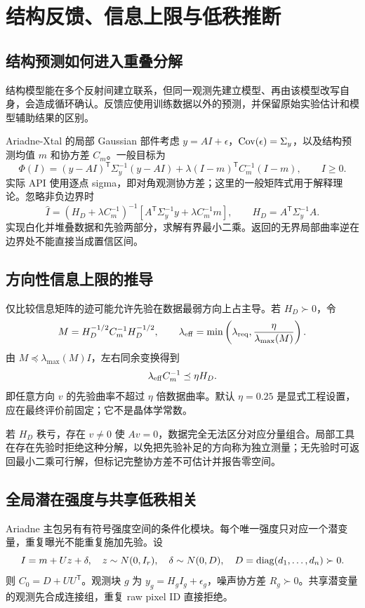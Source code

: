 \chapter{结构反馈、信息上限与低秩推断}
\section{结构预测如何进入重叠分解}
结构模型能在多个反射间建立联系，但同一观测先建立模型、再由该模型改写自身，会造成循环确认。反馈应使用训练数据以外的预测，并保留原始实验估计和模型辅助结果的区别。

Ariadne-Xtal 的局部 Gaussian 部件考虑 $y=A I+\epsilon$，$\operatorname{Cov}(\epsilon)=\Sigma_y$，以及结构预测均值 $m$ 和协方差 $C_m$。一般目标为
\begin{equation}
\Phi(I)=(y-AI)^{\mathsf T}\Sigma_y^{-1}(y-AI)
+\lambda(I-m)^{\mathsf T}C_m^{-1}(I-m),\qquad I\ge0.
\end{equation}
实际  API 使用逐点 sigma，即对角观测协方差；这里的一般矩阵式用于解释理论。忽略非负边界时
\begin{equation}
\widehat I=(H_D+\lambda C_m^{-1})^{-1}
[A^{\mathsf T}\Sigma_y^{-1}y+\lambda C_m^{-1}m],\qquad
H_D=A^{\mathsf T}\Sigma_y^{-1}A.
\end{equation}
实现白化并堆叠数据和先验两部分，求解有界最小二乘。返回的无界局部曲率逆在边界处不能直接当成置信区间。
\section{方向性信息上限的推导}
仅比较信息矩阵的迹可能允许先验在数据最弱方向上占主导。若 $H_D\succ0$，令
\begin{equation}
M=H_D^{-1/2}C_m^{-1}H_D^{-1/2},\qquad
\lambda_{\rm eff}=\min\left(\lambda_{\rm req},\frac{\eta}{\lambda_{\max}(M)}\right).
\end{equation}
由 $M\preceq\lambda_{\max}(M)I$，左右同余变换得到
\begin{equation}
\lambda_{\rm eff}C_m^{-1}\preceq\eta H_D.
\end{equation}
即任意方向 $v$ 的先验曲率不超过 $\eta$ 倍数据曲率。默认 $\eta=0.25$ 是显式工程设置，应在最终评价前固定；它不是晶体学常数。

若 $H_D$ 秩亏，存在 $v\ne0$ 使 $Av=0$，数据完全无法区分对应分量组合。局部工具在存在先验时拒绝这种分解，以免把先验补足的方向称为独立测量；无先验时可返回最小二乘可行解，但标记完整协方差不可估计并报告零空间。
\section{全局潜在强度与共享低秩相关}
Ariadne 主包另有有符号强度空间的条件化模块。每个唯一强度只对应一个潜变量，重复曝光不能重复施加先验。设
\begin{equation}
I=m+Uz+\delta,\quad z\sim N(0,I_r),\quad\delta\sim N(0,D),\quad
D=\operatorname{diag}(d_1,\ldots,d_n)\succ0.
\end{equation}
则 $C_0=D+UU^{\mathsf T}$。观测块 $g$ 为 $y_g=H_gI_g+\epsilon_g$，噪声协方差 $R_g\succ0$。共享潜变量的观测先合成连接组，重复 raw pixel ID 直接拒绝。

